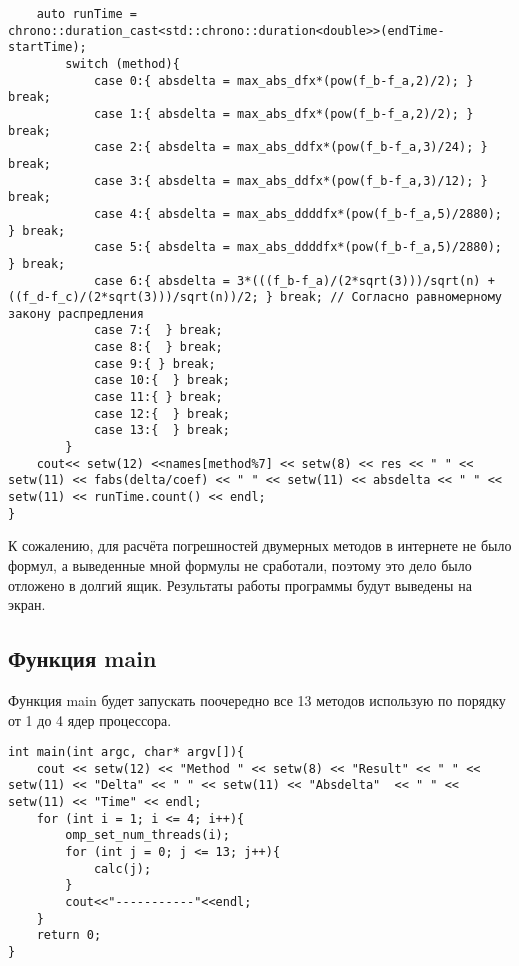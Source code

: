 \documentclass{article}
\begin{document}
\begin{lstlisting}
    auto runTime = chrono::duration_cast<std::chrono::duration<double>>(endTime-startTime);
        switch (method){
            case 0:{ absdelta = max_abs_dfx*(pow(f_b-f_a,2)/2); } break;
            case 1:{ absdelta = max_abs_dfx*(pow(f_b-f_a,2)/2); } break;
            case 2:{ absdelta = max_abs_ddfx*(pow(f_b-f_a,3)/24); } break;
            case 3:{ absdelta = max_abs_ddfx*(pow(f_b-f_a,3)/12); } break;
            case 4:{ absdelta = max_abs_ddddfx*(pow(f_b-f_a,5)/2880); } break;
            case 5:{ absdelta = max_abs_ddddfx*(pow(f_b-f_a,5)/2880); } break;
            case 6:{ absdelta = 3*(((f_b-f_a)/(2*sqrt(3)))/sqrt(n) + ((f_d-f_c)/(2*sqrt(3)))/sqrt(n))/2; } break; // Согласно равномерному закону распредления
            case 7:{  } break;
            case 8:{  } break;
            case 9:{ } break;
            case 10:{  } break;
            case 11:{ } break;
            case 12:{  } break;
            case 13:{  } break;
        }
    cout<< setw(12) <<names[method%7] << setw(8) << res << " " << setw(11) << fabs(delta/coef) << " " << setw(11) << absdelta << " " << setw(11) << runTime.count() << endl;
}
\end{lstlisting}
К сожалению, для расчёта погрешностей двумерных методов в интернете не было формул, а выведенные мной формулы не сработали, поэтому это дело было отложено в долгий ящик. Результаты работы программы будут выведены на экран.
\subsection{Функция main}
Функция main будет запускать поочередно все 13 методов использую по порядку от 1 до 4 ядер процессора. 
\begin{lstlisting}
int main(int argc, char* argv[]){
    cout << setw(12) << "Method " << setw(8) << "Result" << " " << setw(11) << "Delta" << " " << setw(11) << "Absdelta"  << " " << setw(11) << "Time" << endl;
    for (int i = 1; i <= 4; i++){
        omp_set_num_threads(i);
        for (int j = 0; j <= 13; j++){
            calc(j);
        }
        cout<<"-----------"<<endl;
    }
    return 0;
}
\end{lstlisting}
\end{document}
